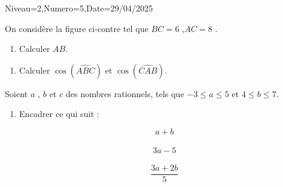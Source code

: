 \documentclass[a4paper,12pt]{article}
\begin{document}
\begin{Maquette}[DS]{Niveau=2,Numero=5,Date=29/04/2025}

\begin{exercice}[BaremeDetaille=true]
\begin{minipage}{.65\linewidth}
On considère la figure ci-contre tel que $BC=6$ ,$AC=8$ .
\begin{enumerate}
\item{} Calculer  $AB$.

\anserline[4]
\end{enumerate}
\end{minipage}
\begin{minipage}{.35\linewidth}
\end{minipage}
\begin{enumerate}[start=2]

\item{} Calculer $\cos(\widehat{ABC})$ et $\cos(\widehat{CAB})$.
\begin{multicols}{2}
\anserline[4]
\columnbreak

\anserline[4]
\end{multicols}
%
%
\end{enumerate}
\end{exercice}

\begin{exercice}[BaremeDetaille=false]
Soient $a$ , $b$ et $c$ des nombres rationnels, tels que $-3\leq a \leq 5$ et $4\leq b \leq 7$.
\begin{enumerate}
\item{} Encadrer ce qui suit :\vspace{-1cm}
\begin{multicols}{3}
\[a+b\]\\ \anserline[8]
\[3a-5\]\\ \anserline[8]
\[\frac{3a+2b}{5}\]\\ \anserline[8]
\end{multicols}
\end{enumerate}
\end{exercice}



\end{Maquette}
\end{document}

